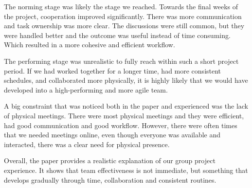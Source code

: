 The norming stage was likely the stage we reached.
Towards the final weeks of the project, cooperation improved significantly.
There was more communication and task ownership was more clear.
The discussions were still common, but they were handled better and the
outcome was useful instead of time consuming.
Which resulted in a more cohesive and efficient workflow.

The performing stage was unrealistic to fully reach within such a short project period.
If we had worked together for a longer time, had more consistent schedules,
and collaborated more physically, it is highly likely that we would have developed into a high-performing and more agile team.

A big constraint that was noticed both in the paper and experienced was the lack of physical meetings.
There were most physical meetings and they were efficient, had good communication and good workflow.
However, there were often times that we needed meetings online, even though
everyone was available and interacted, there was a clear need for physical presence.

Overall, the paper provides a realistic explanation of our group project experience.
It shows that team effectiveness is not immediate, but something that develops gradually through time,
collaboration and consistent routines.
